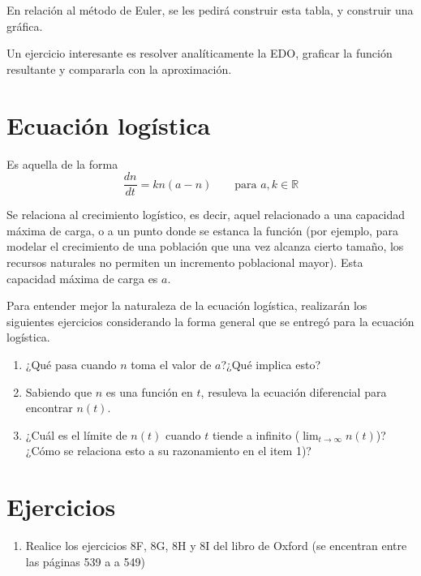 \documentclass[spanish,12pt]{article}
\newcommand{\R}{\mathbb{R}}
\begin{document}
En relación al método de Euler, se les pedirá construir esta tabla, y construir una gráfica.

Un ejercicio interesante es resolver analíticamente la EDO, graficar la función resultante y compararla con la aproximación.

\section{Ecuación logística}
Es aquella de la forma
$$\frac{dn}{dt}=kn(a-n)\quad\quad\text{para }a,k\in\R$$

Se relaciona al crecimiento logístico, es decir, aquel relacionado a una capacidad máxima de carga, o a un punto donde se estanca la función (por ejemplo, para modelar el crecimiento de una población que una vez alcanza cierto tamaño, los recursos naturales no permiten un incremento poblacional mayor). Esta capacidad máxima de carga es $a$. 

Para entender mejor la naturaleza de la ecuación logística, realizarán los siguientes ejercicios considerando la forma general que se entregó para la ecuación logística.
\begin{enumerate}[1)]
    \item ¿Qué pasa cuando $n$ toma el valor de $a$?¿Qué implica esto?
    \item Sabiendo que $n$ es una función en $t$, resuleva la ecuación diferencial para encontrar $n(t)$.
    \item ¿Cuál es el límite de $n(t)$ cuando $t$ tiende a infinito ($\lim_{t\to\infty}n(t)$)?¿Cómo se relaciona esto a su razonamiento en el item 1)?
\end{enumerate}
\section{Ejercicios}
\begin{enumerate}[1)]
    \item Realice los ejercicios 8F, 8G, 8H y 8I del libro de Oxford (se encentran entre las páginas 539 a a 549)
\end{enumerate}
\end{document}
